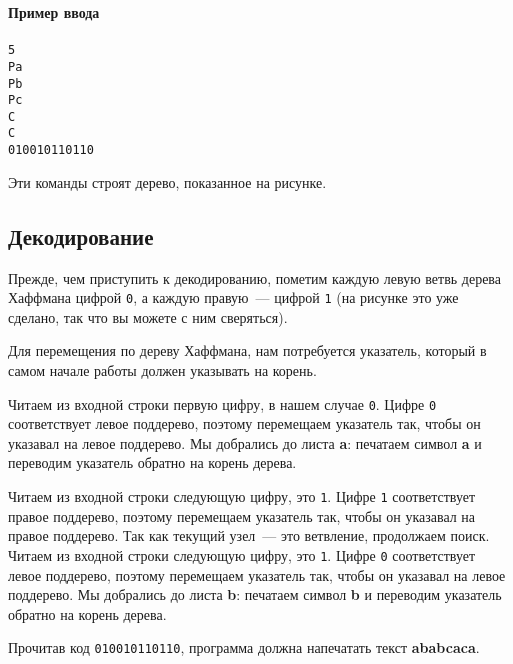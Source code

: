 ﻿\documentclass[a4paper,10pt]{article}
\begin{document}
\noindent\textbf{Пример ввода}\\
\texttt{ \\
5\\
Pa\\
Pb\\
Pc\\
C\\
C\\
010010110110
}

Эти команды строят дерево, показанное на рисунке.

\subsection*{Декодирование}

Прежде, чем приступить к декодированию, пометим каждую левую ветвь дерева Хаффмана цифрой \texttt{0}, а каждую правую~--- цифрой \texttt{1} (на рисунке это уже сделано, так что вы можете с ним сверяться).

Для перемещения по дереву Хаффмана, нам потребуется указатель, который в самом начале работы должен указывать на корень.

Читаем из входной строки первую цифру, в нашем случае \texttt{0}.
Цифре \texttt{0} соответствует левое поддерево, поэтому перемещаем указатель так, чтобы он указавал на левое поддерево.
Мы добрались до листа \textbf{a}: печатаем символ \textbf{a} и переводим указатель обратно на корень дерева.

Читаем из входной строки следующую цифру, это \texttt{1}.
Цифре \texttt{1} соответствует правое поддерево, поэтому перемещаем указатель так, чтобы он указавал на правое поддерево.
Так как текущий узел~--- это ветвление, продолжаем поиск.
Читаем из входной строки следующую цифру, это \texttt{1}.
Цифре \texttt{0} соответствует левое поддерево, поэтому перемещаем указатель так, чтобы он указавал на левое поддерево.
Мы добрались до листа \textbf{b}: печатаем символ \textbf{b} и переводим указатель обратно на корень дерева.

Прочитав код \texttt{010010110110}, программа должна напечатать текст \textbf{ababcaca}.
 
\end{document}
